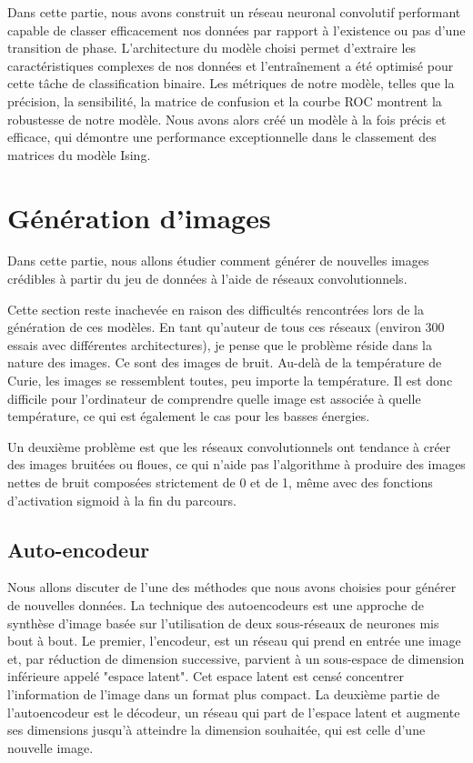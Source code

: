 \documentclass[11pt, parskip=half]{scrartcl} %
\begin{document}
\begin{figure}[h]

\end{figure}

Dans cette partie, nous avons construit un réseau neuronal convolutif performant capable de classer efficacement nos données par rapport à l’existence ou pas d’une transition de phase. L’architecture du modèle choisi permet d’extraire les caractéristiques complexes de nos données et l’entraînement a été optimisé pour cette tâche de classification binaire. Les métriques de notre modèle, telles que la précision, la sensibilité, la matrice de confusion et la courbe ROC montrent la robustesse de notre modèle. Nous avons alors créé un modèle à la fois précis et efficace, qui démontre une performance exceptionnelle dans le classement des matrices du modèle Ising.

\newpage
\section{Génération d'images}
Dans cette partie, nous allons étudier comment générer de nouvelles images crédibles à partir du jeu de données à l'aide de réseaux convolutionnels.

Cette section reste inachevée en raison des difficultés rencontrées lors de la génération de ces modèles. En tant qu'auteur de tous ces réseaux (environ 300 essais avec différentes architectures), je pense que le problème réside dans la nature des images. Ce sont des images de bruit. Au-delà de la température de Curie, les images se ressemblent toutes, peu importe la température. Il est donc difficile pour l'ordinateur de comprendre quelle image est associée à quelle température, ce qui est également le cas pour les basses énergies.

Un deuxième problème est que les réseaux convolutionnels ont tendance à créer des images bruitées ou floues, ce qui n'aide pas l'algorithme à produire des images nettes de bruit composées strictement de 0 et de 1, même avec des fonctions d'activation sigmoid à la fin du parcours.

\subsection{Auto-encodeur}
Nous allons discuter de l'une des méthodes que nous avons choisies pour générer de nouvelles données. La technique des autoencodeurs est une approche de synthèse d'image basée sur l'utilisation de deux sous-réseaux de neurones mis bout à bout. Le premier, l'encodeur, est un réseau qui prend en entrée une image et, par réduction de dimension successive, parvient à un sous-espace de dimension inférieure appelé "espace latent". Cet espace latent est censé concentrer l'information de l'image dans un format plus compact. La deuxième partie de l'autoencodeur est le décodeur, un réseau qui part de l'espace latent et augmente ses dimensions jusqu'à atteindre la dimension souhaitée, qui est celle d'une nouvelle image.
\end{document}
